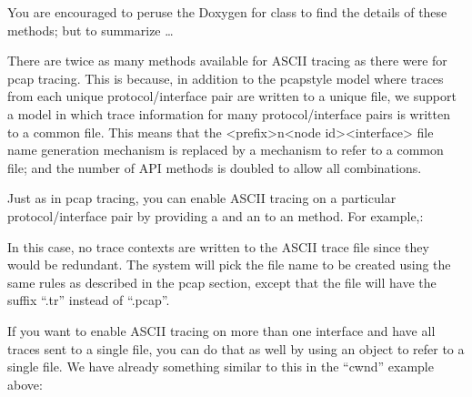\documentclass[letterpaper,10pt,english]{sphinxmanual}
\renewcommand{\sphinxcode}[1]{\texttt{\small{#1}}}
\begin{document}
\begin{sphinxVerbatim}[commandchars=\\\{\}]
   
   
\end{sphinxVerbatim}

You are encouraged to peruse the Doxygen for class \sphinxcode{}
to find the details of these methods; but to summarize …

There are twice as many methods available for ASCII tracing as there were for
pcap tracing. This is because, in addition to the pcap\sphinxhyphen{}style model where traces
from each unique protocol/interface pair are written to a unique file, we
support a model in which trace information for many protocol/interface pairs is
written to a common file. This means that the \textless{}prefix\textgreater{}\sphinxhyphen{}n\textless{}node id\textgreater{}\sphinxhyphen{}\textless{}interface\textgreater{}
file name generation mechanism is replaced by a mechanism to refer to a common
file; and the number of API methods is doubled to allow all combinations.

Just as in pcap tracing, you can enable ASCII tracing on a particular
protocol/interface pair by providing a \sphinxcode{} and an \sphinxcode{} to an
\sphinxcode{} method.  For example,:

\begin{sphinxVerbatim}[commandchars=\\\{\}]
 
   
\end{sphinxVerbatim}

In this case, no trace contexts are written to the ASCII trace file since they
would be redundant. The system will pick the file name to be created using the
same rules as described in the pcap section, except that the file will have the
suffix “.tr” instead of “.pcap”.

If you want to enable ASCII tracing on more than one interface and have all
traces sent to a single file, you can do that as well by using an object to
refer to a single file. We have already something similar to this in the “cwnd”
example above:
\end{document}
